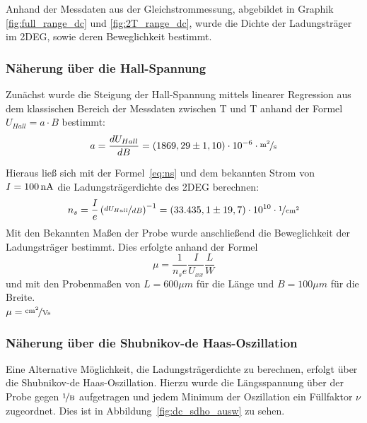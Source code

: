 

Anhand der Messdaten aus der Gleichstrommessung, abgebildet in Graphik \ref{fig:full_range_dc} und \ref{fig:2T_range_dc}, wurde die Dichte der Ladungsträger im 2DEG, sowie deren Beweglichkeit bestimmt.

\subsubsection{Näherung über die Hall-Spannung}
\label{ch:naeherung_hall}

Zunächst wurde die Steigung der Hall-Spannung mittels linearer Regression aus dem klassischen Bereich der Messdaten zwischen \unit[-2]{T} und \unit[2]{T} anhand der Formel $ U_{Hall}=a\cdot B $  
bestimmt:
\begin{equation}
	a=\d{U_{Hall}}{B} = (1869,29 \pm 1,10)\cdot10^{-6} \cdot  \unitfrac{m^2}{s}
\end{equation}

Hieraus ließ sich mit der Formel~\eqref{eq:ns} und dem bekannten Strom von $I=\unit[100]{nA}$ die Ladungsträgerdichte des 2DEG berechnen: 
\begin{equation}
	n_s= \frac{I}{e}\left({\niced{U_{Hall}}{B}}\right)^{-1}=( 33.435,1 \pm 19,7) \cdot 10^{10}\cdot \unitfrac{1}{cm^2}
\end{equation}
Mit den Bekannten Maßen der Probe wurde anschließend die Beweglichkeit der Ladungsträger bestimmt. Dies erfolgte anhand der Formel \\
\begin{equation}
	\mu=\frac{1}{n_se}\frac{I}{U_{xx}}\frac{L}{W}
\end{equation}
und mit den Probenmaßen von $L=600\mu m$ für die Länge und $B=100\mu m$ für die Breite. \\

$\mu= \unitfrac{cm^2}{Vs}$  %

\subsubsection{Näherung über die Shubnikov-de Haas-Oszillation}
\label{ch:naeherung_sdho}

Eine Alternative Möglichkeit, die Ladungsträgerdichte zu berechnen, erfolgt über die Shubnikov-de Haas-Oszillation. Hierzu wurde die Längsspannung über der Probe 
 gegen $\unitfrac{1}{B}$ aufgetragen und jedem Minimum der Oszillation ein Füllfaktor $\nu$ zugeordnet. Dies ist in Abbildung~\ref{fig:dc_sdho_ausw} zu sehen. 

